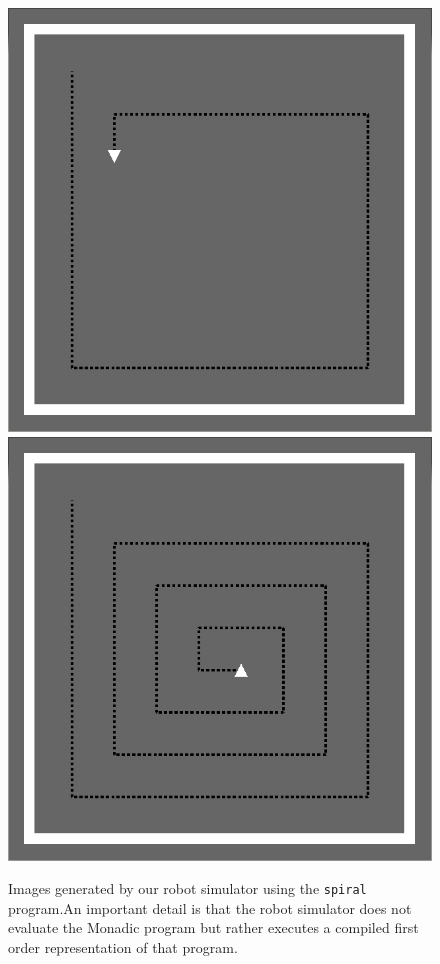 \begin{figure}
\includegraphics[width=.49\linewidth]{./spiral1}
\includegraphics[width=.49\linewidth]{./spiral2}
\caption{Images generated by our robot simulator using the {\tt spiral} program.An important detail is that the robot simulator does not evaluate the Monadic program but rather executes a compiled first order representation of that program.}
\label{fig:spiral}
\end{figure}


